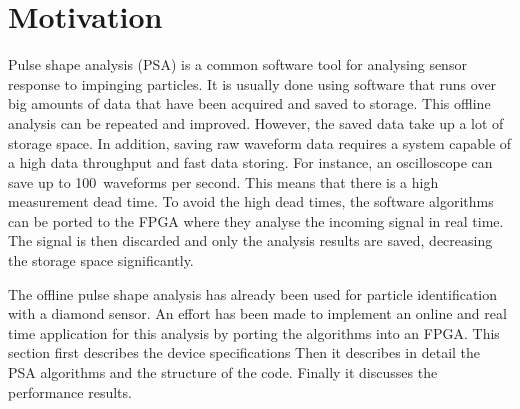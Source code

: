 \documentclass[12pt]{packages/mytustyle}  %
\begin{document}









\section{Motivation}
\label{sec:rtpi}
Pulse shape analysis (PSA) is a common software tool for analysing sensor response to impinging particles. It is usually done using software that runs over big amounts of data that have been acquired and saved to storage. This offline analysis can be repeated and improved. However, the saved data take up a lot of storage space. In addition, saving raw waveform data requires a system capable of a high data throughput and fast data storing. For instance, an oscilloscope can save up to 100~waveforms per second. This means that there is a high measurement dead time. To avoid the high dead times, the software algorithms can be ported to the FPGA where they analyse the incoming signal in real time. The signal is then discarded and only the analysis results are saved, decreasing the storage space significantly.

The offline pulse shape analysis has already been used for particle identification with a diamond sensor. An effort has been made to implement an online and real time application for this analysis by porting the algorithms into an FPGA. This section first describes the device specifications Then it describes in detail the PSA algorithms and the structure of the code. Finally it discusses the performance results.
\end{document}
